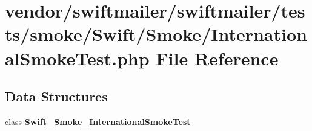 \section{vendor/swiftmailer/swiftmailer/tests/smoke/\+Swift/\+Smoke/\+International\+Smoke\+Test.php File Reference}
\label{_international_smoke_test_8php}
\subsection*{Data Structures}
\begin{DoxyCompactItemize}
\item 
class {\bf Swift\+\_\+\+Smoke\+\_\+\+International\+Smoke\+Test}
\end{DoxyCompactItemize}
